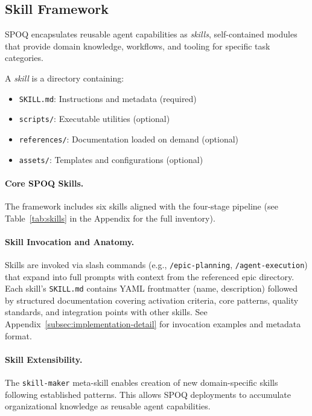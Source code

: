 \subsection{Skill Framework}
\label{subsec:skills}

SPOQ encapsulates reusable agent capabilities as \textit{skills}, self-contained
modules that provide domain knowledge, workflows, and tooling for specific
task categories.

\begin{definition}[Skill]
\label{def:skill}
A \textit{skill} is a directory containing:
\begin{itemize}
    \item \texttt{SKILL.md}: Instructions and metadata (required)
    \item \texttt{scripts/}: Executable utilities (optional)
    \item \texttt{references/}: Documentation loaded on demand (optional)
    \item \texttt{assets/}: Templates and configurations (optional)
\end{itemize}
\end{definition}

\paragraph{Core SPOQ Skills.}
The framework includes six skills aligned with the four-stage pipeline
(see Table~\ref{tab:skills} in the Appendix for the full inventory).

\paragraph{Skill Invocation and Anatomy.}
Skills are invoked via slash commands (e.g., \texttt{/epic-planning},
\texttt{/agent-execution}) that expand into full prompts with context from the
referenced epic directory. Each skill's \texttt{SKILL.md} contains YAML
frontmatter (name, description) followed by structured documentation covering
activation criteria, core patterns, quality standards, and integration points
with other skills. See Appendix~\ref{subsec:implementation-detail} for
invocation examples and metadata format.

\paragraph{Skill Extensibility.}
The \texttt{skill-maker} meta-skill enables creation of new domain-specific
skills following established patterns. This allows SPOQ deployments to
accumulate organizational knowledge as reusable agent capabilities.

